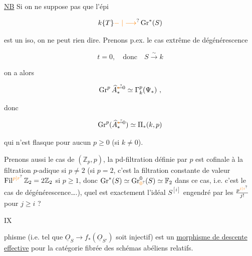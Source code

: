 
\uline{NB} Si on ne suppose pas que l'épi

\[
 k\{T\}\unsure{\relbar|\longrightarrow}\operatorname{Gr}^*(S)
\]

est un iso, on ne peut rien dire. Prenons p.ex. le cas extrême de dégénérescence

\[
 t=0,\quad\text{donc}\quad S\xrightarrow{\sim}k
\]

on a alors

\[
 \operatorname{Gr}^p\widehat A_*^{\deleted{\unsure{*}}0}\simeq\Gamma_k^p(\Psi_*)\ ,
\]

donc

\[
 \operatorname{Gr}^p(\widehat A_*^{\deleted{\unsure{*}}0})\simeq\Pi_*(k,p)
\]

qui n'est flasque pour aucun $p\geq0$ (si $k\ne0$).

Prenons aussi le cas de $(\mathbb Z_p,p)$, la pd-filtration définie par $p$ est cofinale à la filtration $p$-adique si $p\ne2$ (si $p=2$, c'est la filtration constante de valeur $\operatorname{Fil}^{\unsure{p|r}}\mathbb Z_2=2\mathbb Z_2$ si $p\geq1$, donc $\operatorname{Gr}^*(S)\simeq\operatorname{Gr}^{0}_{\unsure{0}}(S)\simeq\mathbb F_2$ dans ce cas, i.e. c'est  le cas de dégénérescence\ldots.), quel est exactement l'idéal  $S^{[i]}$ engendré par les $\frac{p^{\unsure{j|i}}}{j!}$ pour $j\geq i$ ? 



IX

phisme (i.e. tel que $\underline O_S\longrightarrow f_*(\underline O_{S'})$ soit injectif) est un \uline{morphisme de descente effective} pour la catégorie fibrée des schémas abéliens relatifs.

